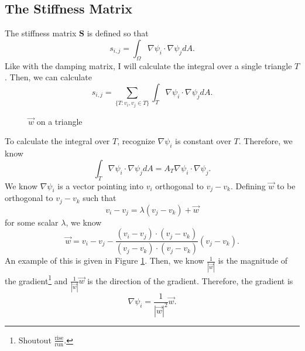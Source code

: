 \subsection{The Stiffness Matrix}

The stiffness matrix $\mathbf{S}$ is defined so that
\[
    s_{i, j} = \int_\Omega \nabla \psi_i \cdot \nabla \psi_j dA.
\]
Like with the damping matrix, I will calculate the integral over a single triangle $T$. Then, we can calculate
\[
    s_{i, j} = \sum_{\{T: v_i, v_j \in T\}} \int_T \nabla \psi_i \cdot \nabla \psi_j dA.
\]

\begin{figure}[t!]
    \centering
    \caption{$\vec{w}$ on a triangle}
    \label{fig:grad-psi}
\end{figure}

To calculate the integral over $T$, recognize $\nabla \psi_i$ is constant over $T$. Therefore, we know
\[
    \int_T \nabla \psi_i \cdot \nabla \psi_j dA = A_T \nabla \psi_i \cdot \nabla \psi_j.
\]
We know $\nabla \psi_i$ is a vector pointing into $v_i$ orthogonal to $v_j - v_k$. Defining $\vec{w}$ to be orthogonal to $v_j - v_k$ such that
\[
    v_i - v_j = \lambda (v_j - v_k) + \vec{w}
\]
for some scalar $\lambda$, we know
\[
    \vec{w} = v_i - v_j - \frac{(v_i - v_j) \cdot (v_j - v_k)}{(v_j - v_k) \cdot (v_j - v_k)} (v_j - v_k).
\]
An example of this is given in Figure \ref{fig:grad-psi}. Then, we know $\frac{1}{|\vec{w}|}$ is the magnitude of the gradient\footnote{Shoutout $
\frac{\text{rise}}{\text{run}}$.} and $\frac{1}{|\vec{w}|} \vec{w}$ is the direction of the gradient. Therefore, the gradient is
\[
    \nabla \psi_i = \frac{1}{|\vec{w}|^2} \vec{w}.
\]

